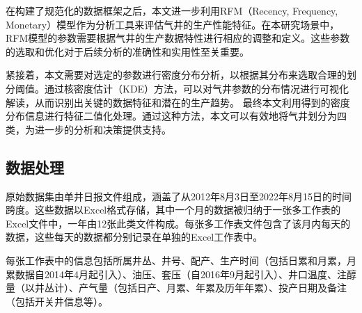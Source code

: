 在构建了规范化的数据框架之后，本文进一步利用RFM（Recency, Frequency, Monetary）模型作为分析工具来评估气井的生产性能特征。在本研究场景中，RFM模型的参数需要根据气井的生产数据特性进行相应的调整和定义。这些参数的选取和优化对于后续分析的准确性和实用性至关重要。

紧接着，本文需要对选定的参数进行密度分布分析，以根据其分布来选取合理的划分阈值。通过核密度估计（KDE）方法，可以对气井参数的分布情况进行可视化解读，从而识别出关键的数据特征和潜在的生产趋势。
最终本文利用得到的密度分布信息进行特征二值化处理。通过这种方法，本文可以有效地将气井划分为四类，为进一步的分析和决策提供支持。
\subsection{数据处理}
\label{cha:data}
原始数据集由单井日报文件组成，涵盖了从2012年8月3日至2022年8月15日的时间跨度。这些数据以Excel格式存储，其中一个月的数据被归纳于一张多工作表的Excel文件中，一年由12张此类文件构成。每张多工作表文件包含了该月内每天的数据，这些每天的数据都分别记录在单独的Excel工作表中。

每张工作表中的信息包括所属井丛、井号、配产、生产时间（包括日累和月累，月累数据自2014年4月起引入）、油压、套压（自2016年9月起引入）、井口温度、注醇量（以井丛计）、产气量（包括日产、月累、年累及历年年累）、投产日期及备注（包括开关井信息等）。

